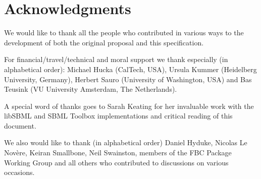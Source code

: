 
\section{Acknowledgments}

We would like to thank all the people who contributed in various ways to the development of both the original proposal and this specification.

For financial/travel/technical and moral support we thank especially (in alphabetical order): Michael Hucka (CalTech, USA), Ursula Kummer (Heidelberg University, Germany), Herbert Sauro (University of Washington, USA) and Bas Teusink (VU University Amsterdam, The Netherlands).

A special word of thanks goes to Sarah Keating for her invaluable work with the \textsf{libSBML} and \textsf{SBML Toolbox} implementations and critical reading of this document.

We also would like to thank (in alphabetical order) Daniel Hyduke, Nicolas Le Nov\`{e}re, Keiran Smallbone, Neil Swainston, members of the \textsf{FBC Package Working Group} and all others who contributed to discussions on various occasions.

